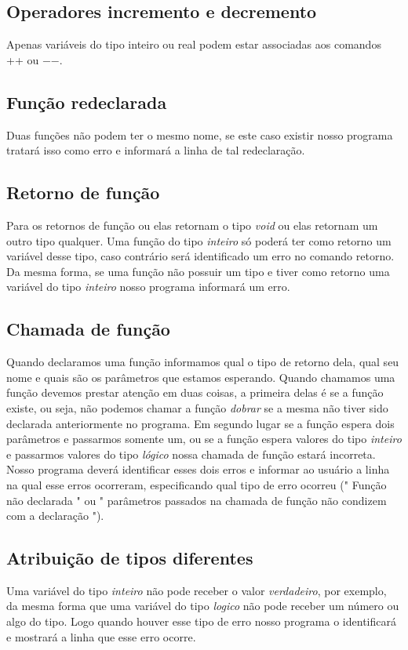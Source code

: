 \documentclass[
12pt,				%
a4paper,			%
english,			%
french,				%
spanish,			%
brazil,				%
article
]{abntex2}
\begin{document}
\subsection{Operadores incremento e decremento}
Apenas variáveis do tipo inteiro ou real podem estar associadas aos comandos ++ ou \textit{$-$$-$}.

\subsection{Função redeclarada}
Duas funções não podem ter o mesmo nome, se este caso existir nosso programa tratará isso como erro e informará a linha de tal redeclaração.

\subsection{Retorno de função}
Para os retornos de função ou elas retornam o tipo \textit{void} ou elas retornam um outro tipo qualquer. Uma função do tipo \textit{inteiro} só poderá ter como retorno um variável desse tipo, caso contrário será identificado um erro no comando retorno. Da mesma forma, se uma função não possuir um tipo e tiver como retorno uma variável do tipo \textit{inteiro} nosso programa informará um erro.

\subsection{Chamada de função}
Quando declaramos uma função informamos qual o tipo de retorno dela, qual seu nome e quais são os parâmetros que estamos esperando. Quando chamamos uma função devemos prestar atenção em duas coisas, a primeira delas é se a função existe, ou seja, não podemos chamar a função \textit{dobrar} se a mesma não tiver sido declarada anteriormente no programa. Em segundo lugar se a função espera dois parâmetros e passarmos somente um, ou se a função espera valores do tipo \textit{inteiro} e passarmos valores do tipo \textit{lógico} nossa chamada de função estará incorreta. Nosso programa deverá identificar esses dois erros e informar ao usuário a linha na qual esse erros ocorreram, especificando qual tipo de erro ocorreu (" Função não declarada " ou " parâmetros passados na chamada de função não condizem com a declaração ").

\subsection{Atribuição de tipos diferentes}
Uma variável do tipo \textit{inteiro} não pode receber o valor \textit{verdadeiro}, por exemplo, da mesma forma que uma variável do tipo \textit{logico} não pode receber um número ou algo do tipo. Logo quando houver esse tipo de erro nosso programa o identificará e mostrará a linha que esse erro ocorre.
\end{document}
